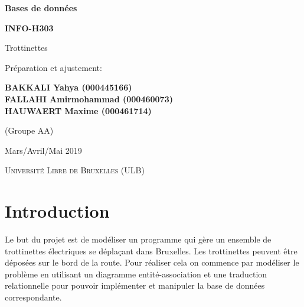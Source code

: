 \documentclass{article}
\begin{document}
\begin{titlepage}
    \begin{center}
        \vspace*{1cm}
        
        
        \Huge
        \textbf{Bases de données}
        
        \Huge
        \textbf{INFO-H303}
        
        \vspace{0.5cm}
        \LARGE
        {Trottinettes}
        
        \vspace{0.5cm}
        
        
        \vspace{1.5cm}
        

        \Large{Préparation et ajustement:}
        
        \vspace{0.25cm}
        
        \textbf{BAKKALI Yahya (000445166) \\}
        \textbf{FALLAHI Amirmohammad (000460073) \\}
        \textbf{HAUWAERT Maxime (000461714) \\}
        
        \vspace{0.25cm}
        
        \LARGE
        {(Groupe AA)}
        
        \vspace{0.8cm}
        
        Mars/Avril/Mai 2019
        
        \vspace{0.8cm}

        \textsc{Université Libre de Bruxelles (ULB)}
        
        
    \end{center}
\end{titlepage}

\section{Introduction}
    Le but du projet est de modéliser un programme qui gère un ensemble de trottinettes électriques se déplaçant dans Bruxelles. Les trottinettes peuvent être déposées sur le bord de la route. Pour réaliser cela on commence par modéliser le problème en utilisant un diagramme entité-association et une traduction relationnelle pour pouvoir implémenter et  manipuler la base de données correspondante.
    
\end{document}
